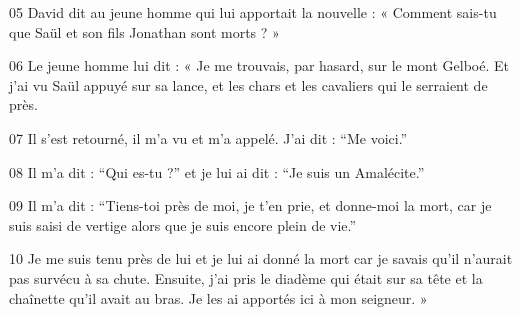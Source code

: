 05 David dit au jeune homme qui lui apportait la nouvelle : « Comment sais-tu que Saül et son fils Jonathan sont morts ? »

06 Le jeune homme lui dit : « Je me trouvais, par hasard, sur le mont Gelboé. Et j’ai vu Saül appuyé sur sa lance, et les chars et les cavaliers qui le serraient de près.

07 Il s’est retourné, il m’a vu et m’a appelé. J’ai dit : “Me voici.”

08 Il m’a dit : “Qui es-tu ?” et je lui ai dit : “Je suis un Amalécite.”

09 Il m’a dit : “Tiens-toi près de moi, je t’en prie, et donne-moi la mort, car je suis saisi de vertige alors que je suis encore plein de vie.”

10 Je me suis tenu près de lui et je lui ai donné la mort car je savais qu’il n’aurait pas survécu à sa chute. Ensuite, j’ai pris le diadème qui était sur sa tête et la chaînette qu’il avait au bras. Je les ai apportés ici à mon seigneur. »
